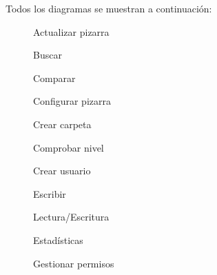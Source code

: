 Todos los diagramas se muestran a continuación: 

\vspace*{3cm}
\begin{figure}[!h,scale=0.3]
\centering
\actualizarPizarra\label{fig:actualizarPizarra}
\caption{Actualizar pizarra}
\end{figure}
\newpage

\begin{figure}[!h]
\centering
\buscar\label{fig:buscar}
\caption{Buscar}
\end{figure}
\newpage

\begin{figure}[!h]
\centering
\comparar\label{fig:comparar}
\caption{Comparar}
\end{figure}
\newpage

\begin{figure}[!h]
\centering
\configurarPizarra\label{fig:configurarPizarra}
\caption{Configurar pizarra}
\end{figure}
\newpage

\begin{figure}[!h]
\centering
\crearCarpeta\label{fig:crearCarpeta}
\caption{Crear carpeta}
\end{figure}
\newpage

\begin{figure}[!h]
\centering
\comprobarNivel\label{fig:comprobarNivel}
\caption{Comprobar nivel}
\end{figure}
\newpage

\begin{figure}[!h]
\centering
\crearUsuario\label{fig:crearUsuario}
\caption{Crear usuario}
\end{figure}
\newpage

\begin{figure}[!h]
\centering
\escribir\label{fig:escribir}
\caption{Escribir}
\end{figure}
\newpage

\begin{figure}[!h]
\centering
\lecturaEscritura\label{fig:lecturaEscritura}
\caption{Lectura/Escritura}
\end{figure}
\newpage

\begin{figure}[!h]
\centering
\estadisticas\label{fig:estadisticas}
\caption{Estadísticas}
\end{figure}
\newpage

\begin{figure}[!h]
\centering
\gestionarPermisos\label{fig:gestionarPermisos}
\caption{Gestionar permisos}
\end{figure}
\newpage

